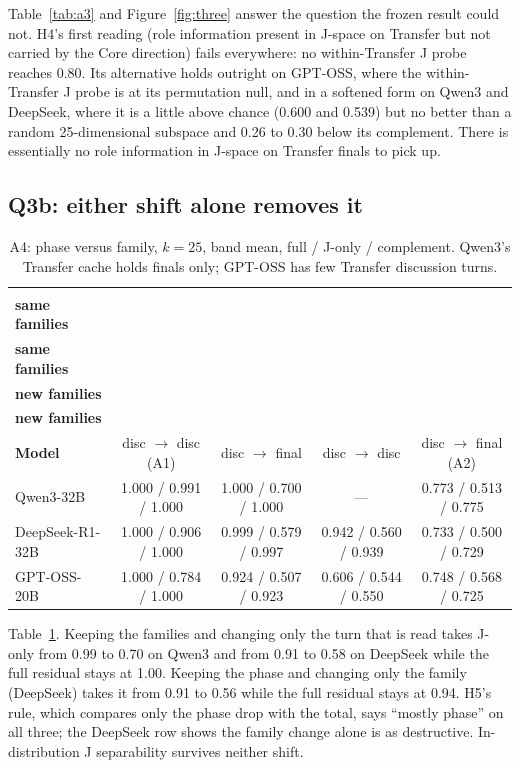 \documentclass[11pt,a4paper]{article}
\begin{document}
Table~\ref{tab:a3} and Figure~\ref{fig:three} answer the question the frozen result could not. H4's first reading (role information present in J-space on Transfer but not carried by the Core direction) fails everywhere: no within-Transfer J probe reaches 0.80. Its alternative holds outright on GPT-OSS, where the within-Transfer J probe is at its permutation null, and in a softened form on Qwen3 and DeepSeek, where it is a little above chance (0.600 and 0.539) but no better than a random 25-dimensional subspace and 0.26 to 0.30 below its complement. There is essentially no role information in J-space on Transfer finals to pick up.

\subsection{Q3b: either shift alone removes it}

\begin{table}[t]
\centering
\caption{A4: phase versus family, $k=25$, band mean, full / J-only / complement. Qwen3's Transfer cache holds finals only; GPT-OSS has few Transfer discussion turns.}
\label{tab:a4}
\footnotesize
\setlength{\tabcolsep}{4pt}
\begin{tabular}{@{}lcccc@{}}
\toprule
 & \shortstack[c]{\textbf{same phase}\\\textbf{same families}} & \shortstack[c]{\textbf{new phase}\\\textbf{same families}} & \shortstack[c]{\textbf{same phase}\\\textbf{new families}} & \shortstack[c]{\textbf{new phase}\\\textbf{new families}} \\
\textbf{Model} & disc $\to$ disc (A1) & disc $\to$ final & disc $\to$ disc & disc $\to$ final (A2) \\
\midrule
Qwen3-32B & 1.000 / 0.991 / 1.000 & 1.000 / 0.700 / 1.000 & --- & 0.773 / 0.513 / 0.775 \\
DeepSeek-R1-32B & 1.000 / 0.906 / 1.000 & 0.999 / 0.579 / 0.997 & 0.942 / 0.560 / 0.939 & 0.733 / 0.500 / 0.729 \\
GPT-OSS-20B & 1.000 / 0.784 / 1.000 & 0.924 / 0.507 / 0.923 & 0.606 / 0.544 / 0.550 & 0.748 / 0.568 / 0.725 \\
\bottomrule
\end{tabular}
\end{table}

Table~\ref{tab:a4}. Keeping the families and changing only the turn that is read takes J-only from 0.99 to 0.70 on Qwen3 and from 0.91 to 0.58 on DeepSeek while the full residual stays at 1.00. Keeping the phase and changing only the family (DeepSeek) takes it from 0.91 to 0.56 while the full residual stays at 0.94. H5's rule, which compares only the phase drop with the total, says ``mostly phase'' on all three; the DeepSeek row shows the family change alone is as destructive. In-distribution J separability survives neither shift.
\end{document}
